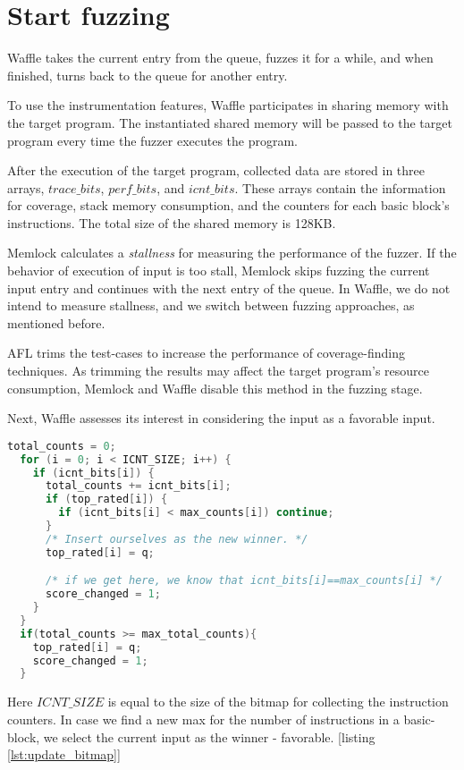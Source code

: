 \section{Start fuzzing}

Waffle takes the current entry from the queue, fuzzes it for a while, and when finished, turns back to the queue for another entry.

To use the instrumentation features, Waffle participates in sharing memory with the target program. The instantiated shared memory will be passed to the target program every time the fuzzer executes the program.

After the execution of the target program, collected data are stored in three arrays, $trace\_bits$, $perf\_bits$, and $icnt\_bits$. These arrays contain the information for coverage, stack memory consumption, and the counters for each basic block's instructions. The total size of the shared memory is 128KB.

Memlock calculates a \textit{stallness} for measuring the performance of the fuzzer. If the behavior of execution of input is too stall, Memlock skips fuzzing the current input entry and continues with the next entry of the queue. In Waffle, we do not intend to measure stallness, and we switch between fuzzing approaches, as mentioned before.

AFL trims the test-cases to increase the performance of coverage-finding techniques. As trimming the results may affect the target program's resource consumption, Memlock and Waffle disable this method in the fuzzing stage. 

Next, Waffle assesses its interest in considering the input as a favorable input. 

\begin{lstlisting}[language=C++,style=CodeStyle,caption={Update bitmap scores},label={lst:update_bitmap}]
  total_counts = 0;
  for (i = 0; i < ICNT_SIZE; i++) {
    if (icnt_bits[i]) {
      total_counts += icnt_bits[i];       
      if (top_rated[i]) {
        if (icnt_bits[i] < max_counts[i]) continue;
      }
      /* Insert ourselves as the new winner. */
      top_rated[i] = q;

      /* if we get here, we know that icnt_bits[i]==max_counts[i] */
      score_changed = 1;
    }
  }
  if(total_counts >= max_total_counts){
    top_rated[i] = q;
    score_changed = 1;
  } 
\end{lstlisting}

Here $ICNT\_SIZE$ is equal to the size of the bitmap for collecting the instruction counters. In case we find a new max for the number of instructions in a basic-block, we select the current input as the winner - favorable. [listing \ref{lst:update_bitmap}]

